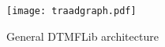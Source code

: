 \begin{figure}[htb]
	\begin{center}
	\texttt{[image: traadgraph.pdf]}
	\caption{General DTMFLib architecture}
	\label{fig:general_architecture}	
	\end{center}
\end{figure}
